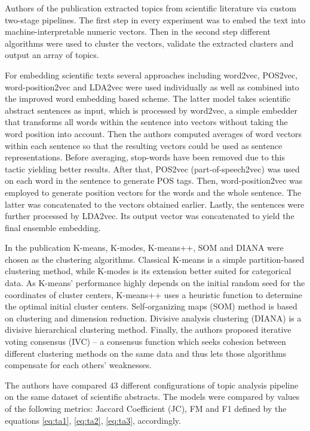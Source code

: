 \documentclass[3p,times,procedia]{elsarticle}
\begin{document}
Authors of the publication \cite{onan2019two} extracted topics from scientific literature via custom two-stage pipelines. The first step in every experiment was to embed the text into machine-interpretable numeric vectors. Then in the second step different algorithms were used to cluster the vectors, validate the extracted clusters and output an array of topics.

For embedding scientific texts several approaches including word2vec, POS2vec, word-position2vec and LDA2vec were used individually as well as combined into the improved word embedding based scheme. The latter model takes scientific abstract sentences as input, which is processed by word2vec, a simple embedder that transforms all words within the sentence into vectors without taking the word position into account. Then the authors computed averages of word vectors within each sentence so that the resulting vectors could be used as sentence representations. Before averaging, stop-words have been removed due to this tactic yielding better results. After that, POS2vec (part-of-speech2vec) was used on each word in the sentence to generate POS tags. Then, word-position2vec was employed to generate position vectors for the words and the whole sentence. The latter was concatenated to the vectors obtained earlier. Lastly, the sentences were further processed by LDA2vec. Its output vector was concatenated to yield the final ensemble embedding.

In the publication K-means, K-modes, K-means++, SOM and DIANA were chosen as the clustering algorithms. Classical K-means is a simple partition-based clustering method, while K-modes is its extension better suited for categorical data. As K-means' performance highly depends on the initial random seed for the coordinates of cluster centers, K-means++ uses a heuristic function to determine the optimal initial cluster centers. Self-organizing maps (SOM) method is based on clustering and dimension reduction. Divisive analysis clustering (DIANA) is a divisive hierarchical clustering method. Finally, the authors proposed iterative voting consensus (IVC) -- a consensus function which seeks cohesion between different clustering methods on the same data and thus lets those algorithms compensate for each others' weaknesses.

The authors have compared 43 different configurations of topic analysis pipeline on the same dataset of scientific abstracts. The models were compared by values of the following metrics: Jaccard Coefficient (JC), FM and F1 defined by the equations \ref{eq:ta1}, \ref{eq:ta2}, \ref{eq:ta3}, accordingly.
\end{document}
